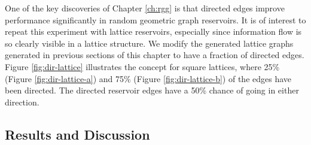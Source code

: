 One of the key discoveries of Chapter \ref{ch:rgg} is that directed edges
improve performance significantly in random geometric graph reservoirs. It is of
interest to repeat this experiment with lattice reservoirs, especially since
information flow is so clearly visible in a lattice structure. We modify the
generated lattice graphs generated in previous sections of this chapter to have
a fraction of directed edges. Figure \ref{fig:dir-lattice} illustrates the
concept for square lattices, where 25\% (Figure \ref{fig:dir-lattice-a}) and
75\% (Figure \ref{fig:dir-lattice-b}) of the edges have been directed. The
directed reservoir edges have a 50\% chance of going in either direction.

\subsection{Results and Discussion}

